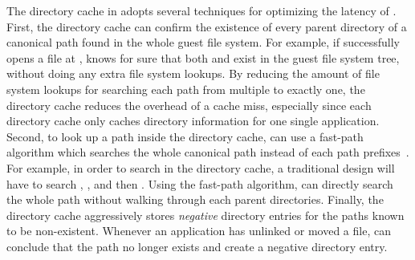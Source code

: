 The directory cache in \thelibos{} adopts several techniques for optimizing the latency of \linuxapis{}.
First, the directory cache
can confirm the existence of every parent directory
of a canonical path
found in the whole guest file system.
For example, if \thelibos{} successfully opens a file at ,
\thelibos{} knows for sure that both 
and  exist in the guest file system tree,
without doing any extra file system lookups.
By reducing the amount of file system lookups for searching each path
from multiple to exactly one,
the directory cache reduces the overhead of a cache miss,
especially since each directory cache
only caches directory information for one single application.
Second, to look up a path inside the directory cache,
\thelibos{} can use a fast-path algorithm which searches the whole canonical path
instead of each path prefixes~\cite{tsai15dcache}.
For example, in order to search  in the directory cache,
a traditional design will have to search
, , and then .
Using the fast-path algorithm,
\thelibos{} can directly search the whole path without walking through each parent directories.
Finally, the directory cache aggressively stores {\em negative} directory entries
for the paths known to be non-existent.
Whenever an application has unlinked or moved a file, \thelibos{} can conclude that the path no longer exists
and create a negative directory entry.







